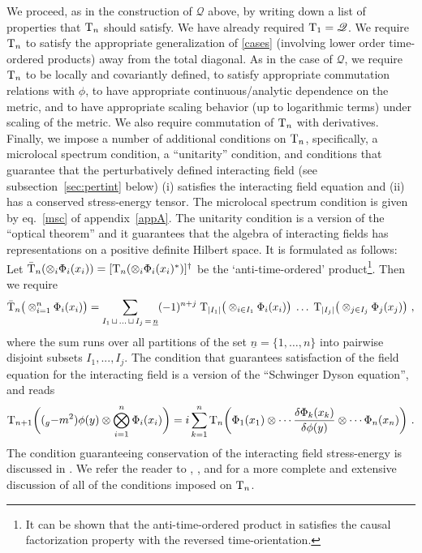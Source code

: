 \documentclass[12pt]{article}
\newcommand{\eQ}{\mathscr{Q}}
\renewcommand{\O}{\Phi}
\newcommand{\T}{{\rm T}}
\theoremstyle{plain}
\theoremstyle{definition}
\def\ben{\begin{equation}}
\def\een{\end{equation}}
\begin{document}
We proceed, as in the construction of $\eQ$ above, by writing down a list of properties that $\T_n$
should satisfy. We have already required $\T_1 = \eQ$. We require $\T_n$ to satisfy the appropriate generalization
of \eqref{cases} (involving lower order time-ordered products) away from the total diagonal.
As in the case of $\eQ$, we require $\T_n$ to be locally and covariantly defined, to satisfy
appropriate commutation relations with $\phi$, to have appropriate continuous/analytic dependence on the metric, and to have appropriate scaling behavior (up to logarithmic terms) under scaling of the metric. We also require commutation of $\T_n$ with derivatives. Finally, we impose a number of additional conditions on $\T_n$, specifically, a
microlocal spectrum condition, a ``unitarity'' condition,
and conditions that guarantee that the perturbatively defined interacting field (see subsection~\ref{sec:pertint} below) (i) satisfies the
interacting field equation and (ii) has a conserved stress-energy tensor. The microlocal spectrum condition is given by
eq.~\eqref{msc} of appendix~\ref{appA}.
The unitarity condition is a version of the ``optical theorem'' and it
guarantees that the algebra of interacting fields has representations on a positive definite Hilbert space. It is formulated as follows:
Let $\bar \T_n(\otimes_i \O_i(x_i)) =
[\T_n(\otimes_i \O_i(x_i)^*)]^\dagger$ be
the \lq anti-time-ordered' product\footnote{It can be shown that the anti-time-ordered product in satisfies the causal factorization property with the reversed time-orientation.}.
Then we require
\begin{equation}
\bar \T_n \big( \otimes_{i=1}^n \O_i(x_i) \big) =
\sum_{I_1 \, \sqcup \, ...\, \sqcup \, I_j \, =\, \underline{n}} (-1)^{n + j} \; \T_{| I_1 |} \big( \otimes_{i \in I_1} \O_i(x_i) \big) \; \dots \; \T_{|I_j|}\big(\otimes_{j \in I_j} \O_j(x_j) \big)~,
\label{atop}
\end{equation}
where the sum runs over all partitions of the set $\underline{n} = \{1, \dots, n\}$ into pairwise disjoint subsets $I_1, ..., I_j$.
The condition that guarantees satisfaction of the field equation for the interacting field is a version of the ``Schwinger Dyson equation'', and reads
\ben\label{dyson}
\T_{n+1}\bigg(
(\square_g - m^2) \phi(y) \otimes \bigotimes_{i=1}^n \O_i(x_i)
\bigg)
= i \sum_{k=1}^n
\T_n
\bigg(
\O_1(x_1) \otimes \cdots \frac{\delta \O_k(x_k)}{\delta \phi(y)} \otimes \cdots \O_n(x_n) \bigg) \ .
\een
The condition guaranteeing conservation of the interacting field stress-energy is discussed in \cite{hw4}. We refer the reader
to \cite{hw1}, \cite{hw2}, and \cite{hw4} for a more complete and extensive discussion of all of the conditions imposed on $\T_n$.
\end{document}

